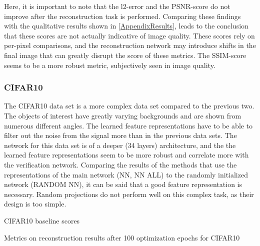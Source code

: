Here, it is important to note that the l2-error and the PSNR-score do not improve after the reconstruction task is performed.
Comparing these findings with the qualitative results shown in \cref{AppendixResults}, 
leads to the conclusion that these scores are not actually indicative of image quality.
These scores rely on per-pixel comparisons, and the reconstruction network may introduce shifts in the final image
that can greatly disrupt the score of these metrics.
The SSIM-score seems to be a more robust metric, subjectively seen in image quality.





\subsubsection{CIFAR10}

The CIFAR10 data set is a more complex data set compared to the previous two.
The objects of interest have greatly varying backgrounds and are shown from numerous different angles.
The learned feature representations have to be able to filter out the noise from the signal more than in
the previous data sets.
The network for this data set is of a deeper (34 layers) architecture, and the
the learned feature representations seem to be more robust and correlate more with the verification network.
Comparing the results of the methods that use the representations of the main network (NN, NN ALL)
to the randomly initialized network (RANDOM NN), it can be said that a good feature representation is necessary.
Random projections do not perform well on this complex task, as their design is too simple.

\begin{table}[!htbp]
\label{tab:cifar10baseline}
\centering
\footnotesize
{}
\caption{CIFAR10 baseline scores}
\end{table}

\begin{table}[!htbp]
\label{tab:cifar10results}
\centering
\footnotesize
{}
\caption{Metrics on reconstruction results after 100 optimization epochs for CIFAR10}
\end{table}





